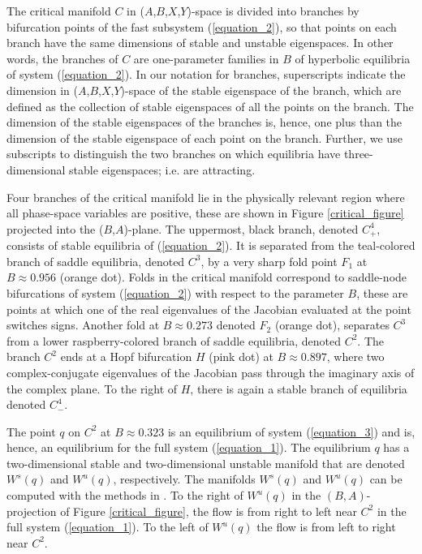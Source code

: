 \documentclass{ws-ijbc}
\begin{document}
The critical manifold $C$ in ($A$,$B$,$X$,$Y$)-space is divided into branches by bifurcation points of the fast subsystem (\ref{equation_2}), so that points on each branch have the same dimensions of stable and unstable eigenspaces.  In other words, the branches of $C$ are one-parameter families in $B$ of hyperbolic equilibria of system (\ref{equation_2}).  In our notation for branches, superscripts indicate the dimension in ($A$,$B$,$X$,$Y$)-space of the stable eigenspace of the branch, which are defined as the collection of stable eigenspaces of all the points on the branch.  The dimension of the stable eigenspaces of the branches is, hence, one plus than the dimension of the stable eigenspace of each point on the branch.  Further, we use subscripts to distinguish the two branches on which equilibria have three-dimensional stable eigenspaces; i.e. are attracting.  

Four branches of the critical manifold lie in the physically relevant region where all phase-space variables are positive, these are shown in Figure \ref{critical_figure} projected into the ($B$,$A$)-plane.  The uppermost, black branch, denoted $C^4_+$, consists of stable equilibria of (\ref{equation_2}).  It is separated from the teal-colored branch of saddle equilibria, denoted $C^3$, by a very sharp fold point $F_1$ at $B \approx 0.956$ (orange dot).  Folds in the critical manifold correspond to saddle-node bifurcations of system (\ref{equation_2}) with respect to the parameter $B$, these are points at which one of the real eigenvalues of the Jacobian evaluated at the point switches signs.  Another fold at $B \approx 0.273$ denoted $F_2$ (orange dot), separates $C^3$ from a lower raspberry-colored branch of saddle equilibria, denoted $C^2$.   The branch $C^2$ ends at a Hopf bifurcation $H$ (pink dot) at $B \approx 0.897$, where two complex-conjugate eigenvalues of the Jacobian pass through the imaginary axis of the complex plane.  To the right of $H$, there is again a stable branch of equilibria denoted $C^4_-$.  

The point $q$ on $C^2$ at $B \approx 0.323$ is an equilibrium of system (\ref{equation_3}) and is, hence, an equilibrium for the full system (\ref{equation_1}).  The equilibrium $q$ has a two-dimensional stable and two-dimensional unstable manifold that are denoted $W^s(q)$ and $W^u(q)$, respectively.  The manifolds $W^{s}(q)$ and $W^{u}(q)$ can be computed with the methods in \cite{Red_book}.  To the right of $W^u(q)$ in the $(B,A)$-projection of Figure \ref{critical_figure}, the flow is from right to left near $C^2$ in the full system (\ref{equation_1}).  To the left of $W^u(q)$ the flow is from left to right near $C^2$.
\end{document}
